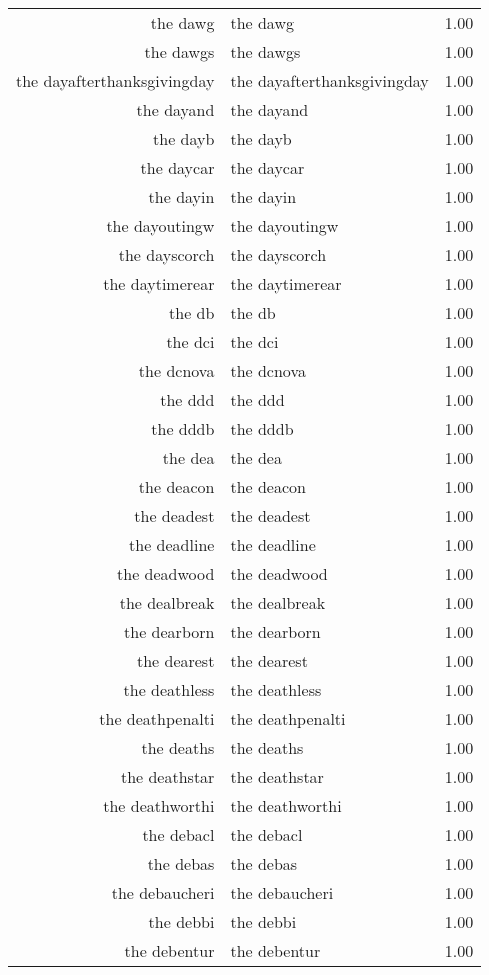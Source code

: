 \begin{table}[ht]
\begin{tabular}{rlr}
  the dawg & the dawg & 1.00 \\ 
  the dawgs & the dawgs & 1.00 \\ 
  the dayafterthanksgivingday & the dayafterthanksgivingday & 1.00 \\ 
  the dayand & the dayand & 1.00 \\ 
  the dayb & the dayb & 1.00 \\ 
  the daycar & the daycar & 1.00 \\ 
  the dayin & the dayin & 1.00 \\ 
  the dayoutingw & the dayoutingw & 1.00 \\ 
  the dayscorch & the dayscorch & 1.00 \\ 
  the daytimerear & the daytimerear & 1.00 \\ 
  the db & the db & 1.00 \\ 
  the dci & the dci & 1.00 \\ 
  the dcnova & the dcnova & 1.00 \\ 
  the ddd & the ddd & 1.00 \\ 
  the dddb & the dddb & 1.00 \\ 
  the dea & the dea & 1.00 \\ 
  the deacon & the deacon & 1.00 \\ 
  the deadest & the deadest & 1.00 \\ 
  the deadline & the deadline & 1.00 \\ 
  the deadwood & the deadwood & 1.00 \\ 
  the dealbreak & the dealbreak & 1.00 \\ 
  the dearborn & the dearborn & 1.00 \\ 
  the dearest & the dearest & 1.00 \\ 
  the deathless & the deathless & 1.00 \\ 
  the deathpenalti & the deathpenalti & 1.00 \\ 
  the deaths & the deaths & 1.00 \\ 
  the deathstar & the deathstar & 1.00 \\ 
  the deathworthi & the deathworthi & 1.00 \\ 
  the debacl & the debacl & 1.00 \\ 
  the debas & the debas & 1.00 \\ 
  the debaucheri & the debaucheri & 1.00 \\ 
  the debbi & the debbi & 1.00 \\ 
  the debentur & the debentur & 1.00 \\ 

\end{tabular}
\end{table}
